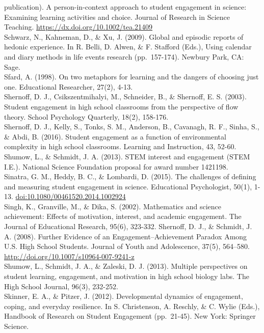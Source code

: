 \documentclass[]{book}
\theoremstyle{definition}
\theoremstyle{definition}
\theoremstyle{definition}
\theoremstyle{remark}
\begin{document}
publication). A person-in-context approach to student engagement in
science: Examining learning activities and choice. Journal of Research
in Science Teaching. \url{https://dx.doi.org/10.1002/tea.21409}\\
Schwarz, N., Kahneman, D., \& Xu, J. (2009). Global and episodic reports
of hedonic experience. In R. Belli, D. Alwen, \& F. Stafford (Eds.),
Using calendar and diary methods in life events research (pp.~157-174).
Newbury Park, CA: Sage.\\
Sfard, A. (1998). On two metaphors for learning and the dangers of
choosing just one. Educational Researcher, 27(2), 4-13.\\
Shernoff, D. J., Csikszentmihalyi, M., Schneider, B., \& Shernoff, E. S.
(2003). Student engagement in high school classrooms from the
perspective of flow theory. School Psychology Quarterly, 18(2),
158-176.\\
Shernoff, D. J., Kelly, S., Tonks, S. M., Anderson, B., Cavanagh, R. F.,
Sinha, S., \& Abdi, B. (2016). Student engagement as a function of
environmental complexity in high school classrooms. Learning and
Instruction, 43, 52-60.\\
Shumow, L., \& Schmidt, J. A. (2013). STEM interest and engagement (STEM
I.E.). National Science Foundation proposal for award number 1421198.\\
Sinatra, G. M., Heddy, B. C., \& Lombardi, D. (2015). The challenges of
defining and measuring student engagement in science. Educational
Psychologist, 50(1), 1-13. \url{doi:10.1080/00461520.2014.1002924}\\
Singh, K., Granville, M., \& Dika, S. (2002). Mathematics and science
achievement: Effects of motivation, interest, and academic engagement.
The Journal of Educational Research, 95(6), 323-332. Shernoff, D. J., \&
Schmidt, J. A. (2008). Further Evidence of an Engagement--Achievement
Paradox Among U.S. High School Students. Journal of Youth and
Adolescence, 37(5), 564--580.
\url{http://doi.org/10.1007/s10964-007-9241-z}\\
Shumow, L., Schmidt, J. A., \& Zaleski, D. J. (2013). Multiple
perspectives on student learning, engagement, and motivation in high
school biology labs. The High School Journal, 96(3), 232-252.\\
Skinner, E. A., \& Pitzer, J. (2012). Developmental dynamics of
engagement, coping, and everyday resilience. In S. Christenson, A.
Reschly, \& C. Wylie (Eds.), Handbook of Research on Student Engagement
(pp.~21-45). New York: Springer Science.\\
\end{document}
